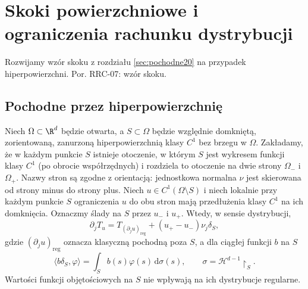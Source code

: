 \setcounter{section}{5}
\section{Skoki powierzchniowe i ograniczenia rachunku dystrybucji}
\label{sec:dt-jumps-products}
\providecommand{\atlasref}[2]{#2}
Rozwijamy wzór skoku z rozdziału \ref{sec:pochodne20}
na przypadek hiperpowierzchni. Por.
\atlasref{PDE-07::thm:pde7-jump}{RRC-07: wzór skoku}.
\subsection{Pochodne przez hiperpowierzchnię}
\begin{twierdzenie}
\label{thm:dt-hypersurface-jump}
Niech $\Omega\subset\R^d$ będzie otwarta, a
$S\subset\Omega$ będzie względnie domkniętą,
zorientowaną, zanurzoną hiperpowierzchnią klasy $C^1$
bez brzegu w $\Omega$. Zakładamy, że w każdym
punkcie $S$ istnieje otoczenie, w którym $S$ jest
wykresem funkcji klasy $C^1$ (po obrocie współrzędnych)
i rozdziela to otoczenie na dwie strony $\Omega_-$
i $\Omega_+$. Nazwy stron są zgodne z orientacją:
jednostkowa normalna $\nu$ jest skierowana
od strony minus do strony plus.
Niech $u\in C^1(\Omega\setminus S)$ i niech lokalnie
przy każdym punkcie $S$ ograniczenia $u$ do obu stron
mają przedłużenia klasy $C^1$ na ich domknięcia.
Oznaczmy ślady na $S$ przez $u_-$ i $u_+$.
Wtedy, w sensie dystrybucji,
\begin{equation}\label{eq:dt-hypersurface-jump}
 \partial_jT_u=T_{(\partial_ju)_{\mathrm{reg}}}
 +(u_+-u_-)\nu_j\delta_S,
\end{equation}
gdzie $(\partial_ju)_{\mathrm{reg}}$ oznacza klasyczną
pochodną poza $S$, a dla ciągłej funkcji $b$ na $S$
\[
 \langle b\delta_S,\varphi\rangle
 =\int_S b(s)\varphi(s)\,\mathrm d\sigma(s),
 \qquad \sigma=\mathcal H^{d-1}\!\restriction_S.
\]
Wartości funkcji objętościowych na $S$ nie wpływają
na ich dystrybucje regularne.
\end{twierdzenie}
